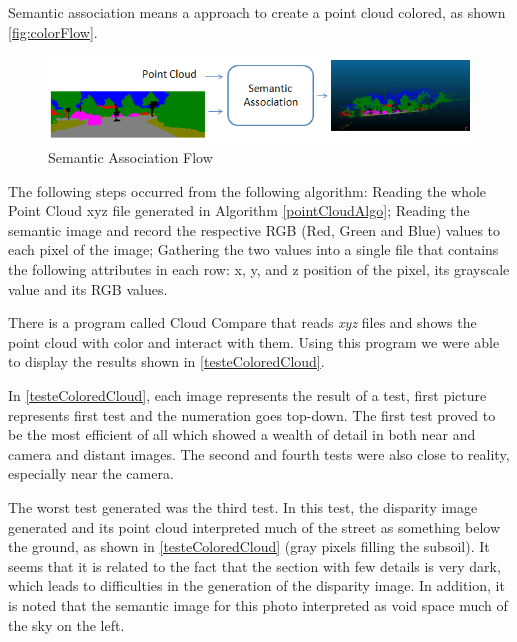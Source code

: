     Semantic association means a approach to create a point cloud colored, as shown \autoref{fig:colorFlow}.
    
    \begin{figure}[H]
        \caption{
        \label{fig:colorFlow}
            Semantic Association Flow}
        \begin{center}
        \includegraphics[width=1\textwidth]{images/colorFlow.png}
        \end{center}
    \end{figure}
    
    The following steps occurred from the following algorithm: Reading the whole Point Cloud xyz file generated in Algorithm \autoref{pointCloudAlgo}; Reading the semantic image and record the respective RGB (Red, Green and Blue) values to each pixel of the image; Gathering the two values into a single file that contains the following attributes in each row: x, y, and z position of the pixel, its grayscale value and its RGB values.

    There is a program called Cloud Compare that reads \textit{xyz} files and shows the point cloud with color and interact with them. Using this program we were able to display the results shown in \autoref{testeColoredCloud}.

    In \autoref{testeColoredCloud}, each image represents the result of a test, first picture represents first test and the numeration goes top-down. The first test proved to be the most efficient of all which showed a wealth of detail in both near and camera and distant images. The second and fourth tests were also close to reality, especially near the camera.

    The worst test generated was the third test. In this test, the disparity image generated and its point cloud interpreted much of the street as something below the ground, as shown in \autoref{testeColoredCloud} (gray pixels filling the subsoil). It seems that it is related to the fact that the section with few details is very dark, which leads to difficulties in the generation of the disparity image. In addition, it is noted that the semantic image for this photo interpreted as void space much of the sky on the left.
    
